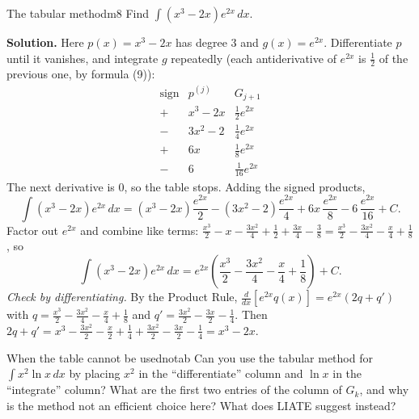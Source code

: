 \documentclass[11pt]{article}
\begin{document}
\begin{exmp}{The tabular method}{m8}
Find $\int\left(x^3-2x\right)e^{2x}\,dx$.

\textbf{Solution.} Here $p(x)=x^3-2x$ has degree $3$ and $g(x)=e^{2x}$. Differentiate $p$ until it vanishes, and integrate $g$ repeatedly (each antiderivative of $e^{2x}$ is $\frac12$ of the previous one, by formula (9)):
\[\begin{array}{c|c|c}\text{sign}&p^{(j)}&G_{j+1}\\\hline+&x^3-2x&\frac12e^{2x}\\-&3x^2-2&\frac14e^{2x}\\+&6x&\frac18e^{2x}\\-&6&\frac1{16}e^{2x}\end{array}\]
The next derivative is $0$, so the table stops. Adding the signed products,
\[\int\left(x^3-2x\right)e^{2x}\,dx=\left(x^3-2x\right)\frac{e^{2x}}2-\left(3x^2-2\right)\frac{e^{2x}}4+6x\,\frac{e^{2x}}8-6\,\frac{e^{2x}}{16}+C .\]
Factor out $e^{2x}$ and combine like terms: $\frac{x^3}2-x-\frac{3x^2}4+\frac12+\frac{3x}4-\frac38=\frac{x^3}2-\frac{3x^2}4-\frac x4+\frac18$, so
\[\int\left(x^3-2x\right)e^{2x}\,dx=e^{2x}\left(\frac{x^3}2-\frac{3x^2}4-\frac x4+\frac18\right)+C .\]
\emph{Check by differentiating.} By the Product Rule, $\frac{d}{dx}\left[e^{2x}q(x)\right]=e^{2x}\left(2q+q'\right)$ with $q=\frac{x^3}2-\frac{3x^2}4-\frac x4+\frac18$ and $q'=\frac{3x^2}2-\frac{3x}2-\frac14$. Then $2q+q'=x^3-\frac{3x^2}2-\frac x2+\frac14+\frac{3x^2}2-\frac{3x}2-\frac14=x^3-2x$.
\end{exmp}

\begin{think}{When the table cannot be used}{notab}
Can you use the tabular method for $\int x^2\ln x\,dx$ by placing $x^2$ in the ``differentiate'' column and $\ln x$ in the ``integrate'' column? What are the first two entries of the column of $G_{k}$, and why is the method not an efficient choice here? What does LIATE suggest instead?
\end{think}
\end{document}
